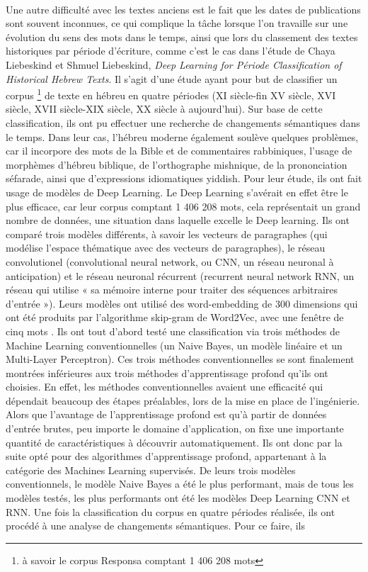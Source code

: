 \documentclass{article}
\begin{document}
\paragraph{}
Une autre difficulté avec les textes anciens est le fait que les dates de publications sont souvent inconnues, ce qui complique la tâche lorsque l’on travaille sur une évolution du sens des mots dans le temps, ainsi que lors du classement des textes historiques par période d’écriture, comme c’est le cas dans l’étude de Chaya Liebeskind et Shmuel Liebeskind, \textit{Deep Learning for Période Classification of Historical Hebrew Texts}. Il s’agit d’une étude ayant pour but de classifier un corpus \footnote{à savoir le corpus Responsa comptant 1 406 208 mots} de texte en hébreu en quatre périodes (XI siècle-fin XV siècle, XVI siècle, XVII siècle-XIX siècle, XX siècle à aujourd’hui). Sur base de cette classification, ils ont pu effectuer une recherche de changements sémantiques dans le temps. Dans leur cas, l’hébreu moderne également soulève quelques problèmes, car il incorpore des mots de la Bible et de commentaires rabbiniques, l’usage de morphèmes d’hébreu biblique, de l’orthographe mishnique, de la prononciation séfarade, ainsi que d’expressions idiomatiques yiddish. Pour leur étude, ils ont fait usage de modèles de Deep Learning. Le Deep Learning s’avérait en effet être le plus efficace, car leur corpus comptant 1 406 208 mots, cela représentait un grand nombre de données, une situation dans laquelle excelle le Deep learning. Ils ont comparé trois modèles différents, à savoir les vecteurs de paragraphes (qui modélise l’espace thématique avec des vecteurs de paragraphes), le réseau convolutionel (convolutional neural network, ou CNN, un réseau neuronal à anticipation) et le réseau neuronal récurrent (recurrent neural network RNN, un réseau qui utilise « sa mémoire interne pour traiter des séquences arbitraires d’entrée »\cite[p. 2]{liebeskind2020deep}). Leurs modèles ont utilisé des word-embedding de 300 dimensions qui ont été produits par l’algorithme skip-gram de Word2Vec, avec une fenêtre de cinq mots . Ils ont tout d’abord testé une classification via trois méthodes de Machine Learning conventionnelles (un Naive Bayes, un modèle linéaire et un Multi-Layer Perceptron). Ces trois méthodes conventionnelles se sont finalement montrées inférieures aux trois méthodes d’apprentissage profond qu’ils ont choisies. En effet, les méthodes conventionnelles avaient une efficacité qui dépendait beaucoup des étapes préalables, lors de la mise en place de l’ingénierie. Alors que l’avantage de l’apprentissage profond est qu’à partir de données d’entrée brutes, peu importe le domaine d’application, on fixe une importante quantité de caractéristiques à découvrir automatiquement. Ils ont donc par la suite opté pour des algorithmes d’apprentissage profond, appartenant à la catégorie des Machines Learning supervisés. De leurs trois modèles conventionnels, le modèle Naive Bayes a été le plus performant, mais de tous les modèles testés, les plus performants ont été les modèles Deep Learning CNN et RNN. Une fois la classification du corpus en quatre périodes réalisée, ils ont procédé à une analyse de changements sémantiques. Pour ce faire, ils 
\end{document}
